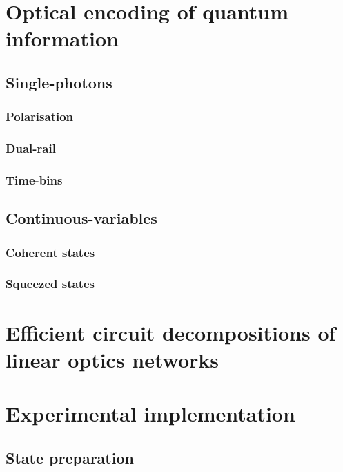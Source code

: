 \documentclass[aps,rmp,twocolumn,amsmath,amssymb,nofootinbib,superscriptaddress]{revtex4}
\newcommand{\comment}[1]{{\color{blue}{#1}}}
\begin{document}
\section{Optical encoding of quantum information}

\subsection{Single-photons}

\subsubsection{Polarisation}

\subsubsection{Dual-rail}

\subsubsection{Time-bins}

\subsection{Continuous-variables}

\subsubsection{Coherent states}

\subsubsection{Squeezed states}

\section{Efficient circuit decompositions of linear optics networks}

\comment{Discuss the Reck et al. decomposition}

\section{Experimental implementation}

\subsection{State preparation}
\end{document}

